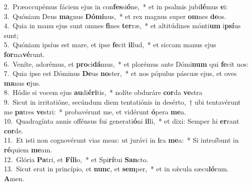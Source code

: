 {2.~}Præoccupémus fáciem ejus in con\textbf{fes}si\textbf{ó}ne,~* et in psalmis jubi\textbf{lé}mus \textbf{e}i:\\
{3.~}Quóniam Deus \textbf{ma}gnus \textbf{Dó}\textbf{mi}nus,~* et rex magnus super \textbf{om}nes \textbf{de}os.\\
{4.~}Quia in manu ejus sunt omnes \textbf{fi}nes \textbf{ter}ræ,~* et altitúdines mónti\textbf{um} i\textbf{psí}us sunt;\\
{5.~}Quóniam ipsíus est mare, et ipse \textbf{fe}cit \textbf{il}lud,~* et siccam manus ejus \textbf{for}ma\textbf{vé}runt.\\
{6.~}Veníte, adorémus, et \textbf{pro}ci\textbf{dá}mus,~* et plorémus ante Dómi\textbf{num} qui \textbf{fe}cit nos:\\
{7.~}Quia ipse est Dóminus \textbf{De}us \textbf{no}ster,~* et nos pópulus páscuæ ejus, et oves \textbf{ma}nus \textbf{e}jus.\\
{8.~}Hódie si vocem ejus \textbf{au}di\textbf{é}\textbf{ri}tis,~* nolíte obduráre \textbf{cor}da \textbf{ve}stra\\
{9.~}Sicut in irritatióne, secúndum diem tentatiónis in desérto,~† ubi tentavérunt me \textbf{pa}tres \textbf{ve}stri:~* probavérunt me, et vidérunt \textbf{ó}pera \textbf{me}a.\\
{10.~}Quadragínta annis offénsus fui generati\textbf{ó}ni \textbf{il}li,~* et dixi: Semper hi \textbf{er}rant \textbf{cor}de.\\
{11.~}Et isti non cognovérunt vias meas: ut jurávi in \textbf{i}ra \textbf{me}a:~* Si introíbunt in \textbf{ré}quiem \textbf{me}am.\\
{12.~}Glória \textbf{Pa}tri, et \textbf{Fí}\textbf{li}o,~* et Spi\textbf{rí}tui \textbf{San}cto.\\
{13.~}Sicut erat in princípio, et \textbf{nunc}, et \textbf{sem}per,~* et in sǽcula sæcu\textbf{ló}rum. \textbf{A}men.\\
